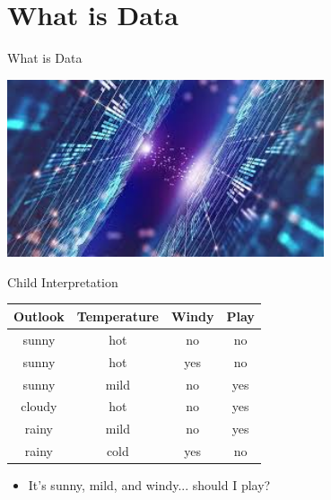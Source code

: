 \documentclass{beamer}
\begin{document}
\section{What is Data}
\begin{frame}{What is Data}
  \begin{center}
    \includegraphics[width=0.7\textwidth]{./whatis_data.jpeg} %
  \end{center}
\end{frame}
\begin{frame}{Child Interpretation}
 \begin{table}[]
    \centering
    \begin{tabular}{cccc}
      \toprule
      \textbf{Outlook} & \textbf{Temperature} & \textbf{Windy} & \textbf{Play} \\ 
      \midrule
      sunny   & hot         & no    & no   \\ 
       sunny   & hot         & yes   & no   \\ 
      sunny   & mild        & no    & yes  \\ 
       cloudy  & hot         & no    & yes  \\ 
      rainy   & mild        & no    & yes  \\ 
       rainy   & cold        & yes   & no   \\ 
      \bottomrule
    \end{tabular}
  \end{table}
  \pause
  \begin{itemize}
    \item It's sunny, mild, and windy... \alert{should I play}?
  \end{itemize}
\end{frame}
\end{document}
